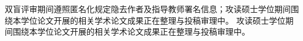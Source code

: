 
\begin{achievements}

\achievementheading[（一）发表的学术论文]
\ifsysublind
双盲评审期间遵照匿名化规定隐去作者及指导教师署名信息；攻读硕士学位期间围绕本学位论文开展的相关学术论文成果正在整理与投稿审理中。
\else
攻读硕士学位期间围绕本学位论文开展的相关学术论文成果正在整理与投稿审理中。
\fi

\end{achievements}

